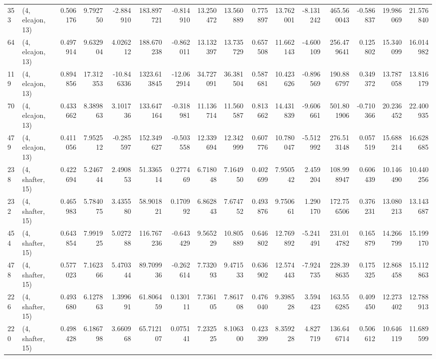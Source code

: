 \begin{tabular}{llrrrrrrrrrrrrrr}
353 &  (4, elcajon, 13) &   0.506176 &   9.792750 &  -2.884910 &   183.897721 &  -0.814910 &  13.250472 &  13.560889 &  0.775897 &  13.762001 &  -8.131242 &   465.560043 & -0.586837 &  19.986069 &  21.576840 \\
64  &  (4, elcajon, 13) &   0.497914 &   9.632904 &   4.026212 &   188.670238 &  -0.862011 &  13.132397 &  13.735729 &  0.657508 &  11.662143 &  -4.600109 &   256.479641 &  0.125802 &  15.340099 &  16.014982 \\
119 &  (4, elcajon, 13) &   0.894856 &  17.312353 & -10.846336 &  1323.613845 & -12.062914 &  34.727091 &  36.381504 &  0.587681 &  10.423626 &  -0.896569 &   190.886797 &  0.349372 &  13.787058 &  13.816179 \\
70  &  (4, elcajon, 13) &   0.433662 &   8.389863 &   3.101736 &   133.647164 &  -0.318981 &  11.136714 &  11.560587 &  0.813662 &  14.431839 &  -9.606661 &   501.801906 & -0.710366 &  20.236452 &  22.400935 \\
479 &  (4, elcajon, 13) &   0.411056 &   7.952512 &  -0.285597 &   152.349627 &  -0.503558 &  12.339694 &  12.342999 &  0.607776 &  10.780047 &  -5.512992 &   276.513148 &  0.057519 &  15.688214 &  16.628685 \\
238 &  (4, shafter, 15) &   0.422694 &   5.246744 &   2.490853 &    51.336514 &   0.277469 &   6.718048 &   7.164950 &  0.402699 &   7.950542 &   2.459204 &   108.998947 &  0.606439 &  10.146490 &  10.440256 \\
232 &  (4, shafter, 15) &   0.465983 &   5.784075 &   3.435580 &    58.901821 &   0.170992 &   6.862843 &   7.674752 &  0.493876 &   9.750661 &   1.290170 &   172.756506 &  0.376231 &  13.080213 &  13.143687 \\
454 &  (4, shafter, 15) &   0.643854 &   7.991925 &   5.027288 &   116.767236 &  -0.643429 &   9.565229 &  10.805889 &  0.646802 &  12.769892 &  -5.241491 &   231.014782 &  0.165879 &  14.266799 &  15.199170 \\
478 &  (4, shafter, 15) &   0.577023 &   7.162366 &   5.470344 &    89.709936 &  -0.262614 &   7.732093 &   9.471533 &  0.636902 &  12.574443 &  -7.924735 &   228.398635 &  0.175325 &  12.868458 &  15.112863 \\
226 &  (4, shafter, 15) &   0.493680 &   6.127863 &   1.399691 &    61.806459 &   0.130111 &   7.736105 &   7.861708 &  0.476040 &   9.398528 &   3.594423 &   163.556285 &  0.409450 &  12.273402 &  12.788913 \\
220 &  (4, shafter, 15) &   0.498428 &   6.186798 &   3.660968 &    65.712107 &   0.075141 &   7.232525 &   8.106300 &  0.423399 &   8.359228 &   4.827719 &   136.646714 &  0.506612 &  10.646119 &  11.689599 \\

\end{tabular}
